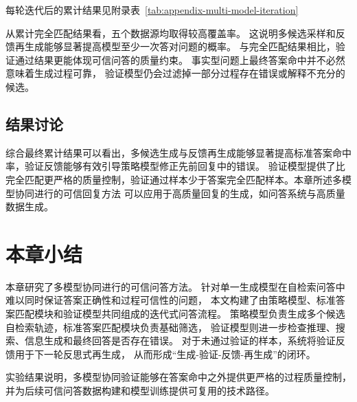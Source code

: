 每轮迭代后的累计结果见附录表~\ref{tab:appendix-multi-model-iteration}

从累计完全匹配结果看，五个数据源均取得较高覆盖率。
这说明多候选采样和反馈再生成能够显著提高模型至少一次答对问题的概率。
与完全匹配结果相比，验证通过结果更能体现可信问答的质量约束。
事实型问题上最终答案命中并不必然意味着生成过程可靠，
验证模型仍会过滤掉一部分过程存在错误或解释不充分的候选。


\subsection{结果讨论}

综合最终累计结果可以看出，多候选生成与反馈再生成能够显著提高标准答案命中率，验证反馈能够有效引导策略模型修正先前回复中的错误。
验证模型提供了比完全匹配更严格的质量控制，验证通过样本少于答案完全匹配样本。本章所述多模型协同进行的可信回复方法
可以应用于高质量回复的生成，如问答系统与高质量数据生成。

\section{本章小结}

本章研究了多模型协同进行的可信问答方法。
针对单一生成模型在自检索问答中难以同时保证答案正确性和过程可信性的问题，
本文构建了由策略模型、标准答案匹配模块和验证模型共同组成的迭代式问答流程。
策略模型负责生成多个候选自检索轨迹，标准答案匹配模块负责基础筛选，
验证模型则进一步检查推理、搜索、信息生成和最终回答是否存在错误。
对于未通过验证的样本，系统将验证反馈用于下一轮反思式再生成，
从而形成“生成-验证-反馈-再生成”的闭环。

实验结果说明，多模型协同验证能够在答案命中之外提供更严格的过程质量控制，
并为后续可信问答数据构建和模型训练提供可复用的技术路径。

